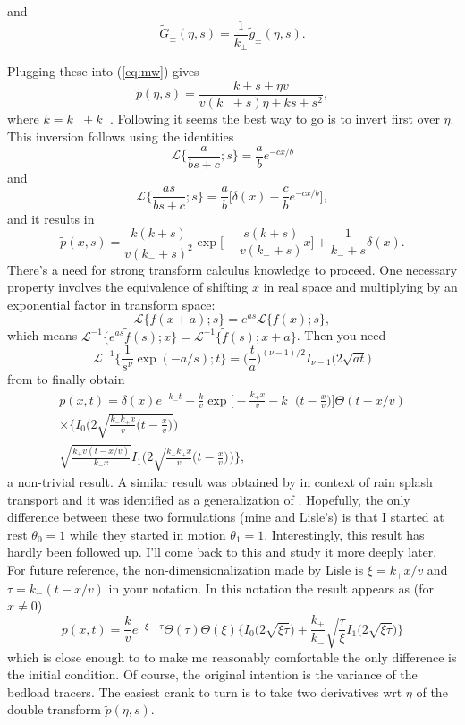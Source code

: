 \documentclass[11pt]{article}
\newcommand\be{\begin{equation}} %
\newcommand\ee{\end{equation}}   %
\newcommand\El{\mathcal{L}}
\newcommand\tg{\tilde{g}}
\newcommand\tG{\tilde{G}}
\begin{document}
and
\be \tG_\pm(\eta,s) = \frac{1}{k_\pm}\tg_\pm(\eta,s).\ee

Plugging these into (\ref{eq:mw}) gives
\be \tilde{p}(\eta,s) = \frac{k + s + \eta v }{v(k_-+s) \eta  + k s + s^2 },\ee
where $k = k_- + k_+$. Following \citet{Lisle1998}it seems the best way to go is to invert first over $\eta$.
This inversion follows using the identities
\be \El\Big\{\frac{a}{bs+c};s\Big\} = \frac{a}{b}e^{-cx/b}\ee
and
\be \El\Big\{\frac{as}{bs+c};s\Big\} = \frac{a}{b}\Big[\delta(x) - \frac{c}{b}e^{-cx/b}\Big],\ee
and it results in 
\be \tilde{p}(x,s) = \frac{k(k+s)}{v(k_-+s)^2} \exp\Big[-\frac{s(k+s)}{v(k_-+s)}x\Big] + \frac{1}{k_-+s}\delta(x) .\ee
There's a need for strong transform calculus knowledge to proceed.
One necessary property involves the equivalence of shifting $x$ in real space and multiplying by an exponential factor in transform space: 
\be \El\{f(x+a);s\} = e^{as}\El\{f(x);s\},\ee
which means $\El^{-1} \{e^{as}\tilde{f}(s);x\} = \El^{-1}\{\tilde{f}(s);x+a\}$.
Then you need 
\be \El^{-1}\big\{\frac{1}{s^\nu}\exp(-a/s);t\} = \Big(\frac{t}{a}\Big)^{(\nu-1)/2}I_{\nu-1}\big(2\sqrt{a t}\big) \ee
from \citet[][2.2.2.1]{Prudnikov1986} to finally obtain 
\begin{multline}
p(x,t) = \delta(x) e^{-k_- t} + \frac{k}{v}\exp\Big[-\frac{k_+x }{v} - k_-\Big(t-\frac{x}{v}\Big)\Big]\Theta(t-x/v)\\ 
 \times \Big\{ I_0\Big(2\sqrt{\frac{k_-k_+x}{v}\big(t-\frac{x}{v}\big)}\Big) \\
\sqrt{\frac{k_+ v(t-x/v)}{k_-x}}I_1\Big(2\sqrt{\frac{k_-k_+x}{v}\big(t-\frac{x}{v}\big)}\Big) 
\Big\},
\end{multline}
a non-trivial result. A similar result was obtained by \citet{Lisle1998} in context of rain splash transport and it was identified as a generalization of \citet{Einstein1937}. Hopefully, the only difference between these two formulations (mine and Lisle's) is that I started at rest $\theta_0=1$ while they started in motion $\theta_1=1$.
Interestingly, this result has hardly been followed up. 
I'll come back to this and study it more deeply later. 
For future reference, the non-dimensionalization made by Lisle is $\xi = k_+ x /v$ and $\tau = k_-(t-x/v)$ in your notation.
In this notation the result appears as (for $x\neq0$)
\be p(x,t) = \frac{k}{v}e^{-\xi-\tau}\Theta(\tau)\Theta(\xi)\Big\{I_0\big(2\sqrt{\xi \tau}\big) +\frac{k_+}{k_-}\sqrt{\frac{\tau}{\xi}}I_1\big(2\sqrt{\xi\tau}\big) \Big\}\ee
which is close enough to \citet{Lisle1998} to make me reasonably comfortable the only difference is the initial condition.
Of course, the original intention is the variance of the bedload tracers.
The easiest crank to turn is to take two derivatives wrt $\eta$ of the double transform $\tilde{p}(\eta,s).$
\end{document}
